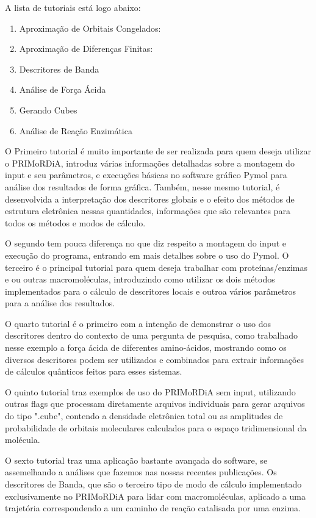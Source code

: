 \documentclass[a4paper,11pt]{refart}
\begin{document}
A lista de tutoriais está logo abaixo:

\begin{enumerate}
	\item Aproximação de Orbitais Congelados:
	\item Aproximação de Diferenças Finitas:
	\item Descritores de Banda
	\item Análise de Força Ácida
	\item Gerando Cubes
	\item Análise de Reação Enzimática
\end{enumerate}

O Primeiro tutorial é muito importante de ser realizada para quem deseja utilizar o PRIMoRDiA, introduz várias informações detalhadas sobre a montagem do input e seu parâmetros, e execuções básicas no software gráfico Pymol para análise dos resultados de forma gráfica. Também, nesse mesmo tutorial, é desenvolvida a interpretação dos descritores globais e o efeito dos métodos de estrutura eletrônica nessas quantidades, informações que são relevantes para todos os métodos e modos de cálculo. 

O segundo tem pouca diferença no que diz respeito a montagem do input e execução do programa, entrando em mais detalhes sobre o uso do Pymol. O terceiro é o principal tutorial para quem deseja trabalhar com proteínas/enzimas e ou outras macromoléculas, introduzindo como utilizar os dois métodos implementados para o cálculo de descritores locais e outroa vários parâmetros para a análise dos resultados.

O quarto tutorial é o primeiro com a intenção de demonstrar o uso dos descritores dentro do contexto de uma pergunta de pesquisa, como trabalhado nesse exemplo a força ácida de diferentes amino-ácidos, mostrando como os diversos descritores podem ser utilizados e combinados para extrair informações de cálculos quânticos feitos para esses sistemas. 

O quinto tutorial traz exemplos de uso do PRIMoRDiA sem input, utilizando outras flags que processam diretamente arquivos individuais para gerar arquivos do tipo ".cube", contendo a densidade eletrônica total ou as amplitudes de probabilidade de orbitais moleculares calculados para o espaço tridimensional da molécula. 

O sexto tutorial traz uma aplicação bastante avançada do software, se assemelhando a análises que fazemos nas nossas recentes publicações. Os descritores de Banda, que são o terceiro tipo de modo de cálculo implementado exclusivamente no PRIMoRDiA para lidar com macromoléculas, aplicado a uma trajetória correspondendo a um caminho de reação catalisada por uma enzima. 
\end{document}

